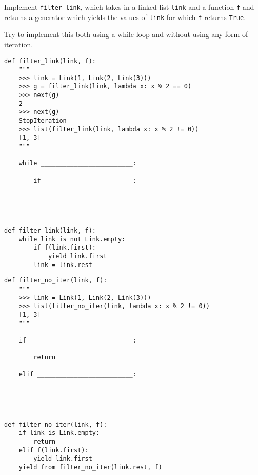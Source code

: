 \question Implement \texttt{filter\_link}, which takes in a linked list \texttt{link}
and a function \texttt{f} and returns a generator which yields the values of \texttt{link}
for which \texttt{f} returns \texttt{True}.

Try to implement this both using a while loop and without using any form of iteration.

\begin{lstlisting}
def filter_link(link, f):
    """
    >>> link = Link(1, Link(2, Link(3)))
    >>> g = filter_link(link, lambda x: x % 2 == 0)
    >>> next(g)
    2
    >>> next(g)
    StopIteration
    >>> list(filter_link(link, lambda x: x % 2 != 0))
    [1, 3]
    """

    while _________________________:

        if ________________________:

            _______________________

        ___________________________
\end{lstlisting}

\begin{solution}[.5in]
\begin{lstlisting}
def filter_link(link, f):
    while link is not Link.empty:
        if f(link.first):
            yield link.first
        link = link.rest
\end{lstlisting}
\end{solution}

\begin{lstlisting}
def filter_no_iter(link, f):
    """
    >>> link = Link(1, Link(2, Link(3)))
    >>> list(filter_no_iter(link, lambda x: x % 2 != 0))
    [1, 3]
    """

    if ____________________________:

        return

    elif __________________________:

        ___________________________

    _______________________________
\end{lstlisting}

\begin{solution}[.5in]
\begin{lstlisting}
def filter_no_iter(link, f):
    if link is Link.empty:
        return
    elif f(link.first):
        yield link.first
    yield from filter_no_iter(link.rest, f)
\end{lstlisting}
\end{solution}
